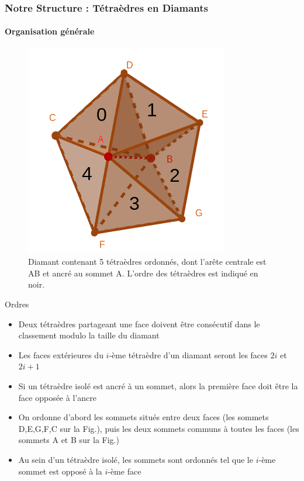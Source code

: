 \documentclass[9pt]{beamer}
\begin{document}
\begin{frame}
\frametitle{Notre Structure : Tétraèdres en Diamants}
\framesubtitle{Organisation générale}
\begin{figure}[H]
\centering
\includegraphics[scale=0.26]{Images/tetra_ordonnee}
\caption{Diamant contenant 5 tétraèdres ordonnés, dont l'arête centrale est AB et ancré au sommet A. L'ordre des tétraèdres est indiqué en noir.}
\end{figure}
\footnotesize
\begin{block}{Ordres}
\begin{itemize}
\item Deux tétraèdres partageant une face doivent être consécutif dans le classement modulo la taille du diamant
\item Les faces extérieures du $i$-ème tétraèdre d'un diamant seront les faces $2i$ et $2i+1$
\item Si un tétraèdre isolé est ancré à un sommet, alors la première face doit être la face opposée à l'ancre
\item On ordonne d'abord les sommets situés entre deux faces (les sommets D,E,G,F,C sur la Fig.), puis les deux sommets communs à toutes les faces (les sommets A et B sur la Fig.)
\item Au sein d'un tétraèdre isolé, les sommets sont ordonnés tel que le $i$-ème sommet est opposé à la $i$-ème face
\end{itemize}
\end{block}
\end{frame}
\end{document}
